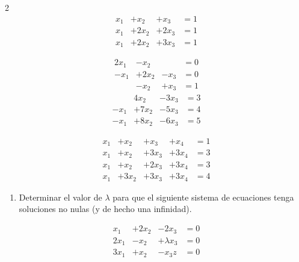 \documentclass[
]{article}
\providecommand{\tightlist}{%
  \setlength{\itemsep}{0pt}\setlength{\parskip}{0pt}}
\begin{document}
\begin{multicols}{2}
\begin{equation*}
  \begin{array}{cccc}
     x_1   & + x_2  & + x_3  & = 1  \\
     x_1   & + 2x_2 & +2x_3  & = 1  \\
     x_1   & + 2x_2 & +3x_3  & = 1
  \end{array}
\end{equation*}

\begin{equation*}
  \begin{array}{cccc}
     2x_1  & - x_2  &       & = 0  \\
     -x_1  & + 2x_2 & -x_3  & = 0  \\
           & - x_2 & + x_3  & = 1
  \end{array}
\end{equation*}
\begin{equation*}
  \begin{array}{cccc}
            &   4x_2  & -3 x_3  & = 3  \\
     -x_1   & + 7x_2  & -5x_3   & = 4  \\
     -x_1   & + 8x_2  & -6x_3   & = 5
  \end{array}
\end{equation*}

\begin{equation*}
  \begin{array}{ccccc}
     x_1   & + x_2  & +x_3  &+x_4   & = 1  \\
     x_1   & + x_2  & +3x_3 &+3x_4  & = 3  \\
     x_1   & + x_2  & +2x_3 &+3x_4  & = 3  \\
     x_1   & +3x_2  & +3x_3 &+3x_4  & = 4
  \end{array}
\end{equation*}
\end{multicols}

\begin{enumerate}
\def\labelenumi{\arabic{enumi}.}
\setcounter{enumi}{3}
\tightlist
\item
  Determinar el valor de \(\lambda\) para que el siguiente sistema de
  ecuaciones tenga soluciones no nulas (y de hecho una infinidad).
\end{enumerate}

\begin{equation*}
  \begin{array}{cccc}
     x_1   & + 2x_2   & -2 x_3        & = 0  \\
     2x_1  & - x_2    & +\lambda x_3  & = 0\\
     3x_1  & + x_2    & -x_3z           & = 0
  \end{array}
\end{equation*}
\end{document}
